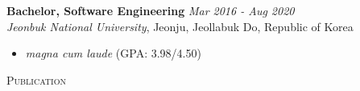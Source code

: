 \documentclass[10pt]{article}
\newenvironment{changemargin}[2]{
  \begin{list}{}{
    \setlength{\topsep}{0pt}
    \setlength{\leftmargin}{#1}
    \setlength{\rightmargin}{#2}
    \setlength{\listparindent}{\parindent}
    \setlength{\itemindent}{\parindent}
    \setlength{\parsep}{\parskip}
  }
  \item[]}{\end{list}
}
\newcommand{\lineover}{
	\begin{changemargin}{-0.05in}{-0.05in}
		\vspace*{-8pt}
		\hrulefill \\
		\vspace*{-2pt}
	\end{changemargin}
}
\newcommand{\header}[1]{
	\begin{changemargin}{-0.5in}{-0.5in}
		\scshape{#1}\\
  	\lineover
	\end{changemargin}
}
\newenvironment{body} {
	\vspace*{-16pt}
	\begin{changemargin}{-0.25in}{-0.5in}
  }
	{\end{changemargin}
}
\begin{document}
\begin{body}
	\vspace{14pt}
	\textbf{Bachelor, Software Engineering} \hfill \emph{Mar 2016 -  Aug 2020} \\
	\emph{Jeonbuk National University}, Jeonju, Jeollabuk Do, Republic of Korea \\
	\begin{itemize} \itemsep -0pt  %
        \item \textit{magna cum laude} (GPA: 3.98/4.50)
	\end{itemize}
\end{body}

\medskip


\header{Publication}
\end{document}
